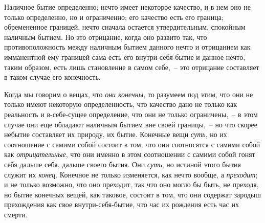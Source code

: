 Наличное бытие определенно; нечто имеет некоторое
качество, и в нем оно не только определенно, но и ограниченно;
его качество есть его граница; обремененное
границей, нечто сначала остается утвердительным,
спокойным наличным бытием. Но это отрицание, когда
оно развито так, что противоположность между наличным
бытием данного нечто и отрицанием как имманентной ему
границей сама есть его внутри-себя-бытие и данное нечто,
таким образом, есть лишь становление в самом
себе,~-- это отрицание составляет в таком случае его конечность.

Когда мы говорим о вещах, что \emph{они конечны}, то разумеем
под этим, что они не только имеют некоторую
определенность, что качество дано не только как реальность
и в-себе-сущее определение, что они не только
ограничены,~-- в этом случае они еще обладают наличным
бытием вне своей границы,~-- но что скорее небытие составляет
их природу, их бытие. Конечные вещи \emph{суть}, но
их соотношение с самими собой состоит в том, что они
соотносятся с самими собой как \emph{отрицательные}, что они
именно в этом соотношении с самими собой гонят себя
дальше себя, дальше своего бытия. Они \emph{суть}, но истиной
этого бытия служит их \emph{конец}. Конечное не только изменяется,
как нечто вообще, а \emph{преходит}; и не только возможно,
что оно преходит, так что оно могло бы быть,
не преходя, но бытие конечных вещей, как таковое, состоит
в том, что они содержат зародыш прехождения как
свое внутри-себя-бытие, что час их рождения есть час
их смерти.


